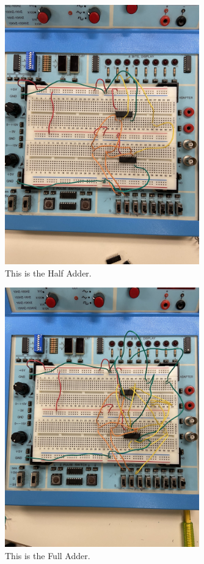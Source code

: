 \documentclass[11pt]{article}
\begin{document}
\begin{figure}[ht]\centering
	\includegraphics[width=0.75\textwidth, angle = 270]{Half Adder}
	\caption{This is the Half Adder.}
	\label{fig:original_logo}			%
\end{figure}

\begin{figure}[ht]\centering
	\includegraphics[width=0.75\textwidth, angle = 270]{Full Adder}
	\caption{This is the Full Adder.}
	\label{fig:original_logo}			%
\end{figure}
\end{document}
